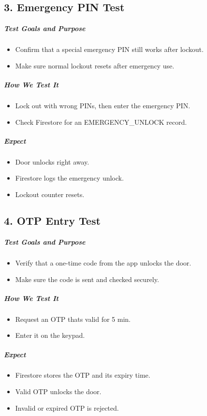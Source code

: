 \subsection*{3. Emergency PIN Test}
\subparagraph{Test Goals and Purpose}
\begin{itemize}
    \item Confirm that a special emergency PIN still works after lockout.
    \item Make sure normal lockout resets after emergency use.
\end{itemize}
\subparagraph{How We Test It}
\begin{itemize}
    \item Lock out with wrong PINs, then enter the emergency PIN.
    \item Check Firestore for an EMERGENCY\_UNLOCK record.
\end{itemize}
\subparagraph{ Expect}
\begin{itemize}
    \item Door unlocks right away.
    \item Firestore logs the emergency unlock.
    \item Lockout counter resets.
\end{itemize}

\subsection*{4. OTP Entry Test}
\subparagraph{Test Goals and Purpose}
\begin{itemize}
    \item Verify that a one-time code from the app unlocks the door.
    \item Make sure the code is sent and checked securely.
\end{itemize}
\subparagraph{How We Test It}
\begin{itemize}
    \item Request an OTP thats valid for 5 min.
    \item Enter it on the keypad.
\end{itemize}
\subparagraph{ Expect}
\begin{itemize}
    \item Firestore stores the OTP and its expiry time.
    \item Valid OTP unlocks the door.
    \item Invalid or expired OTP is rejected.
\end{itemize}

